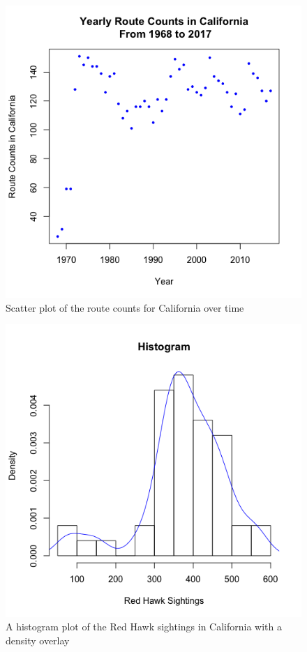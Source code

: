 \documentclass{asaproc}
\begin{document}
\begin{figure}
    \centering
    \includegraphics[scale=0.4]{Routes.png}
    \caption{Scatter plot of the route counts for California over time}
    \label{Routes}
\end{figure}
\begin{figure}
    \centering
    \includegraphics[scale=0.35]{Hist_Dens.png}
    \caption{A histogram plot of the Red Hawk sightings in California with a density overlay}
    \label{HistDensOriginal}
\end{figure}
\end{document}
